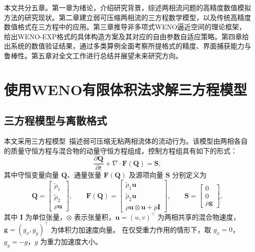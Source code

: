 \documentclass[12pt,a4paper]{article}
\numberwithin{equation}{section}    %
\begin{document}
本文共分五章。第一章为绪论，介绍研究背景，综述两相流问题的高精度数值模拟方法的研究现状。第二章建立弱可压缩两相流的三方程数学模型，以及传统高精度数值格式在三方程中的应用。第三章推导非多项式WENO逼近空间的理论框架，给出WENO-EXP格式的具体构造方案及其对应的自由参数自适应策略。第四章给出系统的数值验证结果，通过多类算例全面考察所提格式的精度、界面捕获能力与鲁棒性。第五章对全文工作进行总结并展望未来研究方向。



%         


\cleardoublepage
\section{使用WENO有限体积法求解三方程模型}

\subsection{三方程模型与离散格式}
本文采用三方程模型~\cite{Chanteperdrix2004,grenier2013accurate}描述弱可压缩无粘两相流体的流动行为。该模型由两相各自的质量守恒方程与混合物的动量守恒方程组成，控制方程组具有如下的形式：
\begin{equation}
    \label{eq:governing}
    \frac{\partial \bm{Q}}{\partial t} + \nabla \cdot \bm{F}(\bm{Q}) = \bm{S},
\end{equation}
其中守恒变量向量 $\bm{Q}$、通量张量 $\bm{F}(\bm{Q})$ 及源项向量 $\bm{S}$ 分别定义为
\begin{equation}
    \bm{Q} =
    \begin{bmatrix}
        \tilde{\rho}_1 \\
        \tilde{\rho}_2 \\
        \rho \bm{u}
    \end{bmatrix},
    \qquad
    \bm{F}(\bm{Q}) =
    \begin{bmatrix}
        \tilde{\rho}_1 \bm{u} \\
        \tilde{\rho}_2 \bm{u} \\
        \rho \bm{u} \otimes \bm{u} + p \bm{I}
    \end{bmatrix},
    \qquad
    \bm{S} = \begin{bmatrix}
        0 \\
        0 \\
        \rho \bm{g}
    \end{bmatrix},
\end{equation}
其中 $\bm{I}$ 为单位张量，$\otimes$ 表示张量积，$\bm{u} = (u, v)^\top$
为两相共享的混合物速度，$\bm{g} = (g_x, g_y)^\top$ 为体积力加速度向量。
在仅受重力作用的情形下，取 $g_x = 0$，$g_y = -g$，$g$ 为重力加速度大小。
\end{document}
